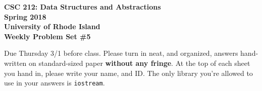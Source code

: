 \documentclass[11pt]{article}
\begin{document}
\thispagestyle{empty}

\begin{center}
    {\Large\bf CSC 212: Data Structures and Abstractions}\\
    \medskip
    {\Large\bf Spring 2018}\\
    \medskip
    {\Large\bf University of Rhode Island}\\
    \bigskip
    {\Large\bf Weekly Problem Set \#5}
\end{center}

Due Thursday 3/1 before class. Please turn in neat, and organized, answers hand-written on standard-sized paper \textbf{without any fringe}. At the top of each sheet you hand in, please write your name, and ID.
The only library you're allowed to use in your answers is \verb|iostream|.
\end{document}
